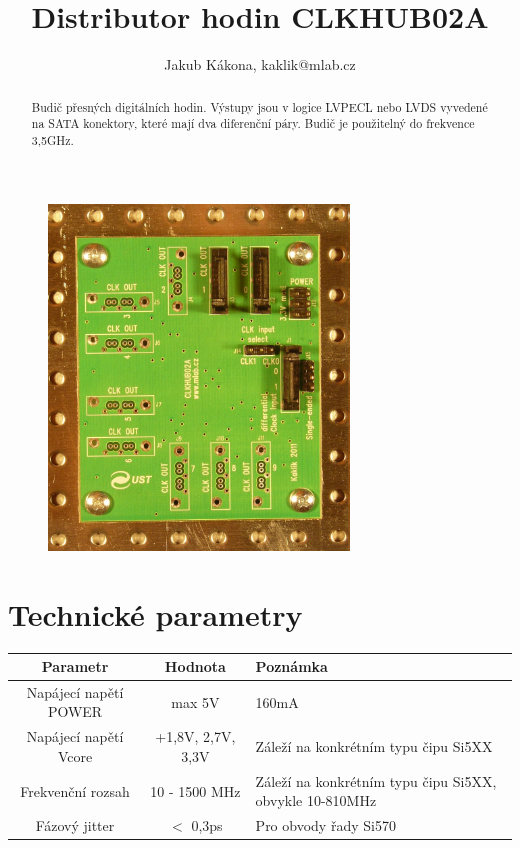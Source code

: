 \documentclass[12pt,a4paper,oneside]{article}
\begin{document}
\title{Distributor hodin CLKHUB02A}
\author{Jakub Kákona, kaklik@mlab.cz}
\maketitle

\thispagestyle{empty}
\begin{abstract}
Budič přesných digitálních hodin. Výstupy jsou v logice LVPECL nebo LVDS vyvedené na SATA konektory, které mají dva diferenční páry. Budič je použitelný do frekvence 3,5GHz.
\end{abstract}

\begin{figure} [htbp]
\begin{center}
\includegraphics [width=80mm] {CLKHUB02A_Top_Big.JPG} 
\end{center}
\end{figure}

\tableofcontents

\section{Technické parametry}
\begin{table}[htbp]
\begin{center}
\begin{tabular}{|c|c|p{4.7cm}|}
\hline
Parametr & Hodnota & Poznámka \\
\hline
Napájecí napětí POWER  & max 5V &  160mA \\ 
\hline
Napájecí napětí Vcore & +1,8V, 2,7V, 3,3V &  Záleží na konkrétním typu čipu Si5XX \\ 
\hline
Frekvenční rozsah  & 10 - 1500 MHz & Záleží na konkrétním typu čipu Si5XX, obvykle 10-810MHz \\ 
\hline
Fázový jitter  & $<$ 0,3ps & Pro obvody řady Si570 \\ 
\hline
\end{tabular}
\end{center}
\end{table}
\end{document}
